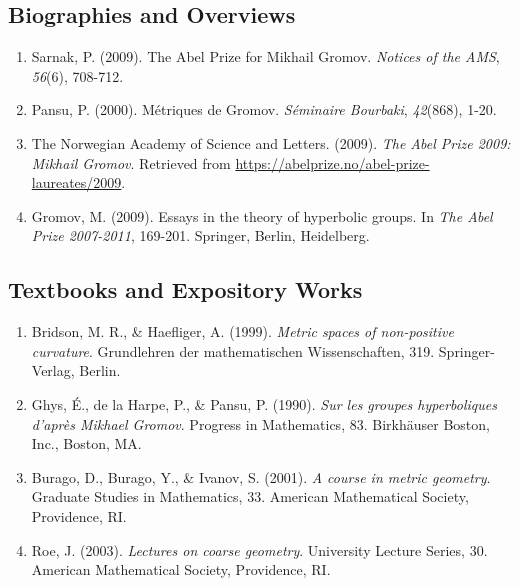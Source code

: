 \subsection*{Biographies and Overviews}
\begin{enumerate}
    \item Sarnak, P. (2009). The Abel Prize for Mikhail Gromov. \textit{Notices of the AMS}, \textit{56}(6), 708-712.
    \item Pansu, P. (2000). Métriques de Gromov. \textit{Séminaire Bourbaki}, \textit{42}(868), 1-20.
    \item The Norwegian Academy of Science and Letters. (2009). \textit{The Abel Prize 2009: Mikhail Gromov}. Retrieved from \url{https://abelprize.no/abel-prize-laureates/2009}.
    \item Gromov, M. (2009). Essays in the theory of hyperbolic groups. In \textit{The Abel Prize 2007-2011}, 169-201. Springer, Berlin, Heidelberg.
\end{enumerate}

\subsection*{Textbooks and Expository Works}
\begin{enumerate}
    \item Bridson, M. R., \& Haefliger, A. (1999). \textit{Metric spaces of non-positive curvature}. Grundlehren der mathematischen Wissenschaften, 319. Springer-Verlag, Berlin.
    \item Ghys, É., de la Harpe, P., \& Pansu, P. (1990). \textit{Sur les groupes hyperboliques d'après Mikhael Gromov}. Progress in Mathematics, 83. Birkhäuser Boston, Inc., Boston, MA.
    \item Burago, D., Burago, Y., \& Ivanov, S. (2001). \textit{A course in metric geometry}. Graduate Studies in Mathematics, 33. American Mathematical Society, Providence, RI.
    \item Roe, J. (2003). \textit{Lectures on coarse geometry}. University Lecture Series, 30. American Mathematical Society, Providence, RI.
\end{enumerate}
